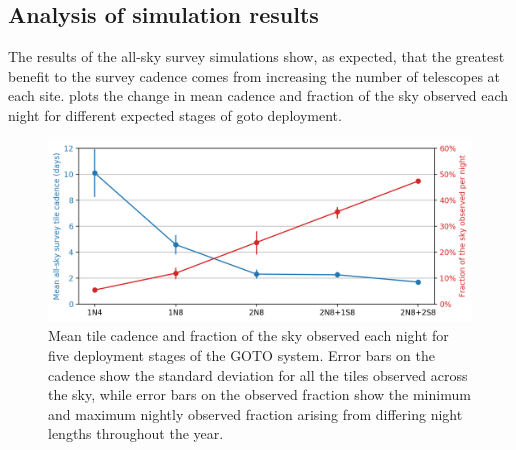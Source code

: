 \begin{colsection}
\begin{colsection}
\end{colsection}


\subsection{Analysis of simulation results}
\label{sec:survey_sim_analysis}
\begin{colsection}

The results of the all-sky survey simulations show, as expected, that the greatest benefit to the survey cadence comes from increasing the number of telescopes at each site.  plots the change in mean cadence and fraction of the sky observed each night for different expected stages of \gls{goto} deployment.

\begin{figure}[t]
    \begin{center}
        \includegraphics[width=\linewidth]{images/survey_sims/results.png}
    \end{center}
    \caption[Tile cadence and nightly sky observation for different GOTO systems]{
        Mean tile cadence and fraction of the sky observed each night for five deployment stages of the GOTO system. Error bars on the cadence show the standard deviation for all the tiles observed across the sky, while error bars on the observed fraction show the minimum and maximum nightly observed fraction arising from differing night lengths throughout the year.
    }\label{fig:survey_sim_results}
\end{figure}


\end{colsection}
\end{colsection}
